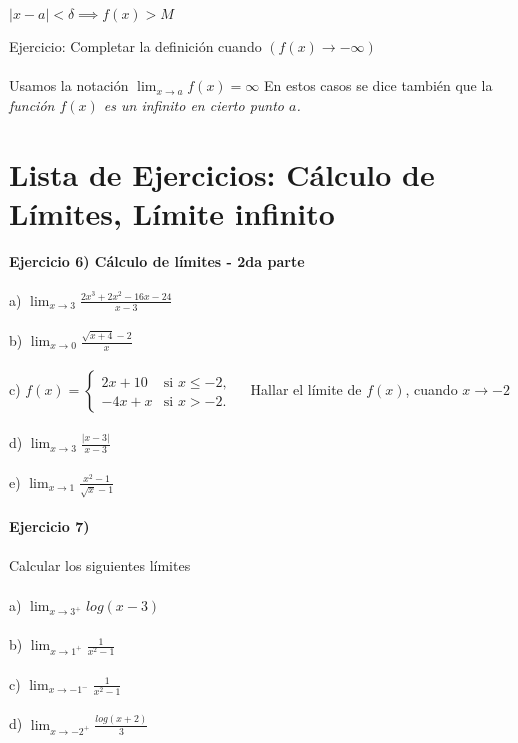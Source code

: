 \documentclass[11pt, a4paper]{article}
\begin{document}
{\begin{center}
    {\color{blue} $| x-a | < \delta \implies f(x) > M $}
\end{center}

{\color{magenta} Ejercicio: Completar la definici\'on cuando $( f(x) \to -\infty )$} \\ \\ 
Usamos la notaci\'on {\color{blue}$ \displaystyle \lim_{x \to a} f(x) = \infty $} En estos casos se dice tambi\'en que la \textit{funci\'on $f(x)$ es un infinito en cierto punto $a$. }


\newpage
\section{ Lista de Ejercicios: C\'alculo de L\'imites, L\'imite infinito }
\textbf{ Ejercicio 6) C\'alculo de l\'imites - 2da parte } \\ \\
a) $ \displaystyle  \lim_{x \to 3} \frac{ 2x^3 + 2x^2 -16x -24 }{ x - 3} $ \\ \\
b) $ \displaystyle  \lim_{x \to 0} \frac{ \sqrt{x+4} - 2 }{ x } $ \\ \\
c) $ 
    f(x) = \begin{cases}
              2x + 10 & \text{si } x \leq -2,\\
               -4x + x & \text{si } x > -2.
          \end{cases}
  $ ~ Hallar el l\'imite de $f(x)$, cuando $ x \to -2 $ \\ \\
d) $ \displaystyle  \lim_{x \to 3} \frac{ |x-3| }{ x-3 } $ \\ \\ 
e) $ \displaystyle  \lim_{x \to 1} \frac{ x^2 - 1 }{ \sqrt{x}-1 } $ \\ \\
\textbf{ Ejercicio 7) }\\ \\
Calcular los siguientes l\'imites \\ \\ 
a) $ \displaystyle \lim_{x \to 3^+} log(x-3)  $ \\ \\
b) $ \displaystyle \lim_{ x \to 1^+} \frac{1}{x^2 - 1} $ \\ \\
c) $ \displaystyle \lim_{ x \to -1^-} \frac{1}{x^2 - 1} $ \\ \\
d) $ \displaystyle \lim_{ x \to -2^+} \frac{log(x+2)}{3} $ \\ \\

}
\end{document}
